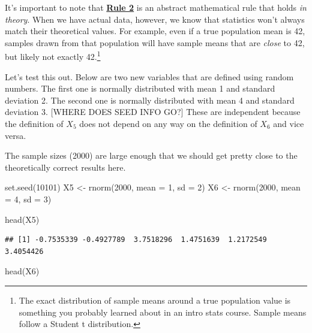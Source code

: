 \documentclass[
]{book}
\newenvironment{Shaded}{\begin{snugshade}}{\end{snugshade}}
\newcommand{\AttributeTok}[1]{\textcolor[rgb]{0.77,0.63,0.00}{#1}}
\newcommand{\DecValTok}[1]{\textcolor[rgb]{0.00,0.00,0.81}{#1}}
\newcommand{\FunctionTok}[1]{\textcolor[rgb]{0.00,0.00,0.00}{#1}}
\newcommand{\NormalTok}[1]{#1}
\newcommand{\OtherTok}[1]{\textcolor[rgb]{0.56,0.35,0.01}{#1}}
\begin{document}
It's important to note that \protect\hyperlink{Rule2}{\textbf{Rule 2}} is an abstract mathematical rule that holds \emph{in theory}. When we have actual data, however, we know that statistics won't always match their theoretical values. For example, even if a true population mean is 42, samples drawn from that population will have sample means that are \emph{close} to 42, but likely not exactly 42.\footnote{The exact distribution of sample means around a true population value is something you probably learned about in an intro stats course. Sample means follow a Student t distribution.}

Let's test this out. Below are two new variables that are defined using random numbers. The first one is normally distributed with mean 1 and standard deviation 2. The second one is normally distributed with mean 4 and standard deviation 3. {[}WHERE DOES SEED INFO GO?{]} These are independent because the definition of \(X_{5}\) does not depend on any way on the definition of \(X_{6}\) and vice versa.

The sample sizes (2000) are large enough that we should get pretty close to the theoretically correct results here.

\begin{Shaded}
\begin{Highlighting}[]
\FunctionTok{set.seed}\NormalTok{(}\DecValTok{10101}\NormalTok{)}
\NormalTok{X5 }\OtherTok{\textless{}{-}} \FunctionTok{rnorm}\NormalTok{(}\DecValTok{2000}\NormalTok{, }\AttributeTok{mean =} \DecValTok{1}\NormalTok{, }\AttributeTok{sd =} \DecValTok{2}\NormalTok{)}
\NormalTok{X6 }\OtherTok{\textless{}{-}} \FunctionTok{rnorm}\NormalTok{(}\DecValTok{2000}\NormalTok{, }\AttributeTok{mean =} \DecValTok{4}\NormalTok{, }\AttributeTok{sd =} \DecValTok{3}\NormalTok{)}
\end{Highlighting}
\end{Shaded}

\begin{Shaded}
\begin{Highlighting}[]
\FunctionTok{head}\NormalTok{(X5)}
\end{Highlighting}
\end{Shaded}

\begin{verbatim}
## [1] -0.7535339 -0.4927789  3.7518296  1.4751639  1.2172549  3.4054426
\end{verbatim}

\begin{Shaded}
\begin{Highlighting}[]
\FunctionTok{head}\NormalTok{(X6)}
\end{Highlighting}
\end{Shaded}
\end{document}
